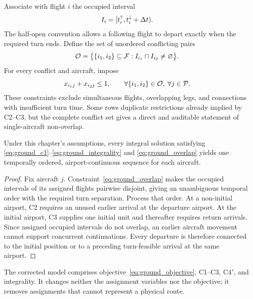 Associate with flight $i$ the occupied interval
\begin{equation}
    I_i=[t_i^{\uparrow},t_i^{\downarrow}+\Delta t).
    \label{eq:ground_occupied_interval}
\end{equation}
The half-open convention allows a following flight to depart exactly when the
required turn ends. Define the set of unordered conflicting pairs
\begin{equation}
    \mathcal O=\bigl\{\{i_1,i_2\}\subseteq\mathcal{F}:
    I_{i_1}\cap I_{i_2}\neq\varnothing\bigr\}.
    \label{eq:ground_overlap_set}
\end{equation}
For every conflict and aircraft, impose
\begin{equation}
    x_{i_1j}+x_{i_2j}\leq1,
    \qquad
    \forall\{i_1,i_2\}\in\mathcal O,\;\forall j\in\mathcal{P}.
    \label{eq:ground_overlap}
\end{equation}
These constraints exclude simultaneous flights, overlapping legs, and
connections with insufficient turn time. Some rows duplicate restrictions
already implied by C2--C3, but the complete conflict set gives a direct and
auditable statement of single-aircraft non-overlap.

\begin{proposition}
    \label{prop:ground_corrected_validity}
    Under this chapter's assumptions, every integral solution satisfying
    \eqref{eq:ground_c1}--\eqref{eq:ground_integrality} and
    \eqref{eq:ground_overlap} yields one temporally ordered,
    airport-continuous sequence for each aircraft.
\end{proposition}

\begin{proof}
    Fix aircraft $j$. Constraint~\eqref{eq:ground_overlap} makes the occupied
    intervals of its assigned flights pairwise disjoint, giving an unambiguous
    temporal order with the required turn separation. Process that order. At a
    non-initial airport, C2 requires an unused earlier arrival at the departure
    airport. At the initial airport, C3 supplies one initial unit and thereafter
    requires return arrivals. Since assigned occupied intervals do not overlap,
    an earlier aircraft movement cannot support concurrent continuations. Every
    departure is therefore connected to the initial position or to a preceding
    turn-feasible arrival at the same airport.
\end{proof}

The corrected model comprises objective~\eqref{eq:ground_objective},
C1--C3, C4$'$, and integrality. It changes neither the assignment variables nor
the objective; it removes assignments that cannot represent a physical route.

